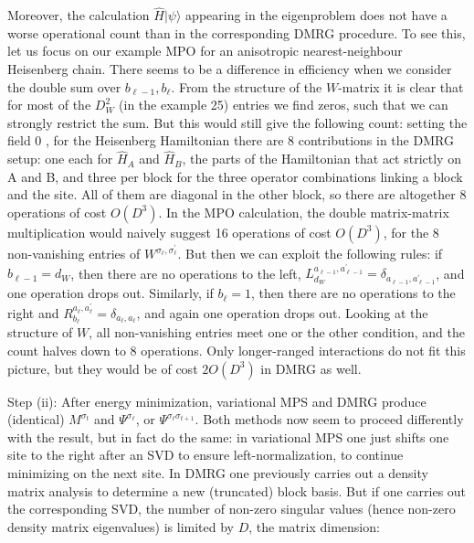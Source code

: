 \documentclass[12pt]{article}
\begin{document}
Moreover, the calculation $\hat{H}|\psi\rangle$ appearing in the eigenproblem does not have a worse operational count than in the corresponding DMRG procedure. To see this, let us focus on our example MPO for an anisotropic nearest-neighbour Heisenberg chain. There seems to be a difference in efficiency when we consider the double sum over $b_{\ell-1}, b_{\ell}$. From the structure of the $W$-matrix it is clear that for most of the $D_{W}^{2}$ (in the example 25) entries we find zeros, such that we can strongly restrict the sum. But this would still give the following count: setting the field 0 , for the Heisenberg Hamiltonian there are 8 contributions in the DMRG setup: one each for $\hat{H}_{A}$ and $\hat{H}_{B}$, the parts of the Hamiltonian that act strictly on A and B, and three per block for the three operator combinations linking a block and the site. All of them are diagonal in the other block, so there are altogether 8 operations of cost $O\left(D^{3}\right)$. In the MPO calculation, the double matrix-matrix multiplication would naively suggest 16 operations of cost $O\left(D^{3}\right)$, for the 8 non-vanishing entries of $W^{\sigma_{\ell}, \sigma_{\ell}^{\prime}}$. But then we can exploit the following rules: if $b_{\ell-1}=d_{W}$, then there are no operations to the left, $L_{d_{W}}^{a_{\ell-1}, a_{\ell-1}^{\prime}}=\delta_{a_{\ell-1}, a_{\ell-1}^{\prime}}$, and one operation drops out. Similarly, if $b_{\ell}=1$, then there are no operations to the right and $R_{b_{\ell}}^{a_{\ell}, a_{\ell}^{\prime}}=\delta_{a_{\ell}, a_{\ell}}$, and again one operation drops out. Looking at the structure of $W$, all non-vanishing entries meet one or the other condition, and the count halves down to 8 operations. Only longer-ranged interactions do not fit this picture, but they would be of cost $2 O\left(D^{3}\right)$ in DMRG as well.

Step (ii): After energy minimization, variational MPS and DMRG produce (identical) $M^{\sigma_{t}}$ and $\Psi^{\sigma_{\ell}}$, or $\Psi^{\sigma_{\ell} \sigma_{t+1}}$. Both methods now seem to proceed differently with the result, but in fact do the same: in variational MPS one just shifts one site to the right after an SVD to ensure left-normalization, to continue minimizing on the next site. In DMRG one previously carries out a density matrix analysis to determine a new (truncated) block basis. But if one carries out the corresponding SVD, the number of non-zero singular values (hence non-zero density matrix eigenvalues) is limited by $D$, the matrix dimension:
\end{document}
